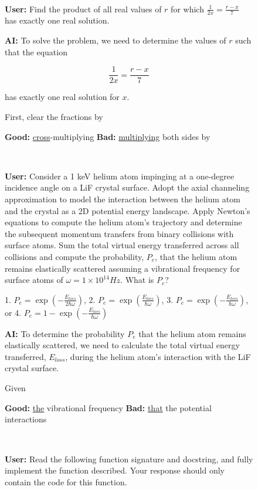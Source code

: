 \documentclass[11pt]{article}
\begin{document}
\begin{figure}
\begin{AIbox}{}
\tt \footnotesize
\begin{minipage}{0.99\textwidth}
\textbf{User:} Find the product of all real values of $r$ for which $\frac{1}{2x}=\frac{r-x}{7}$ has exactly one real solution.

\textbf{AI:} To solve the problem, we need to determine the values of \( r \) such that the equation 

\[
\frac{1}{2x} = \frac{r-x}{7}
\]

has exactly one real solution for \( x \).

First, clear the fractions by

\textbf{Good:} \underline{cross}-multiplying \hspace{2em} \textbf{Bad:} \underline{multiplying} both sides by
\end{minipage}
\end{AIbox}

\begin{AIbox}{}
\tt \footnotesize
\begin{minipage}{0.99\textwidth}
\textbf{User:} Consider a 1 keV helium atom impinging at a one-degree incidence angle on a LiF crystal surface. Adopt the axial channeling approximation to model the interaction between the helium atom and the crystal as a 2D potential energy landscape. Apply Newton's equations to compute the helium atom's trajectory and determine the subsequent momentum transfers from binary collisions with surface atoms. Sum the total virtual energy transferred across all collisions and compute the probability, $P_e$, that the helium atom remains elastically scattered assuming a vibrational frequency for surface atoms of $\omega = 1 \times 10^{14} Hz$. What is $P_e$?

1. $P_e = \exp(-\frac{E_{loss}}{2\hbar \omega})$, 2. $P_e = \exp(\frac{E_{loss}}{\hbar \omega})$, 3. $P_e = \exp(-\frac{E_{loss}}{\hbar \omega})$, or 4. $P_e = 1 - \exp(-\frac{E_{loss}}{\hbar \omega})$

\textbf{AI:} To determine the probability \( P_e \) that the helium atom remains elastically scattered, we need to calculate the total virtual energy transferred, \( E_{loss} \), during the helium atom's interaction with the LiF crystal surface.

Given

\textbf{Good:} \underline{the} vibrational frequency \hspace{2em} \textbf{Bad:} \underline{that} the potential interactions
\end{minipage}
\end{AIbox}
\begin{AIbox}{}
\tt \footnotesize
\begin{minipage}{0.99\textwidth}
\textbf{User:} Read the following function signature and docstring, and fully implement the function described. Your response should only contain the code for this function.


\end{minipage}
\end{AIbox}
\end{figure}
\end{document}
